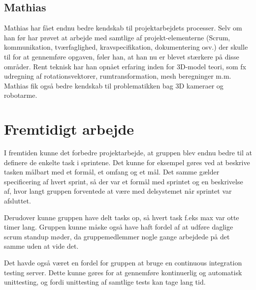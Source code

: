 \subsection{Mathias}
Mathias har fået endnu bedre kendskab til projektarbejdets processer. Selv om han før har prøvet at arbejde med samtlige af projekt-elementerne (Scrum, kommunikation, tværfaglighed, kravspecifikation, dokumentering osv.) der skulle til for at gennemføre opgaven, føler han, at han nu er blevet stærkere på disse områder. Rent teknisk har han opnået erfaring inden for 3D-model teori, som fx udregning af rotationsvektorer, rumtransformation, mesh beregninger m.m. Mathias fik også bedre kendskab til problematikken bag 3D kameraer og robotarme.

\section{Fremtidigt arbejde}
I fremtiden kunne det forbedre projektarbejde, at gruppen blev endnu bedre til at definere de enkelte task i sprintene. Det kunne for eksempel gøres ved at beskrive tasken målbart med et formål, et omfang og et mål. Det samme gælder specificering af hvert sprint, så der var et formål med sprintet og en beskrivelse af, hvor langt gruppen forventede at være med delsystemet når sprintet var afsluttet.

Derudover kunne gruppen have delt tasks op, så hvert task f.eks max var otte timer lang. Gruppen kunne måske også have haft fordel af at udføre daglige scrum standup møder, da gruppemedlemmer nogle gange arbejdede på det samme uden at vide det. 

Det havde også været en fordel for gruppen at bruge en continuous integration testing server. Dette kunne gøres for at gennemføre kontinuerlig og automatisk unittesting, og fordi unittesting af samtlige tests kan tage lang tid.
